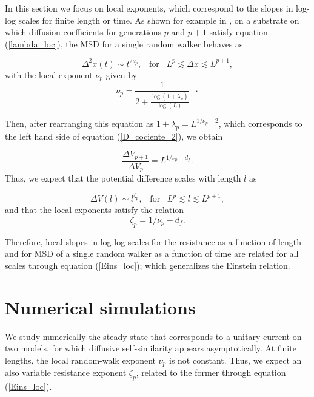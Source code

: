 \documentclass[12pt]{iopart}
\begin{document}
In this section we focus on  local exponents, which
correspond to the slopes in log-log scales for finite
length or time. As shown for example in \cite{Padilla2010}, on a substrate on which
diffusion coefficients for generations $p$ and $p+1$ satisfy
equation 
(\ref{lambda_loc}), the  MSD for a single random walker behaves as
 

\begin{equation}
    \Delta^2 x(t)\sim t^{2\nu_p},\;\;\;\mbox{for}\;\;\; L^p \lesssim \Delta x
    \lesssim L^{p+1}, 
    \label{msd-loc}
\end{equation}
with the local  exponent $\nu_p$ given by
\begin{equation}
    \nu_p =\frac{\displaystyle 1}{\displaystyle 2+\frac{\displaystyle
    \log(1+\lambda_p)}{\displaystyle \log(L)}}\;\;\cdot
    \label{nu_loc}
\end{equation}

Then, after rearranging this equation as $1+\lambda_p=L^{1/\nu_p-2}$, which 
corresponds to the  left hand side of equation (\ref{D_cociente_2}), 
we obtain

\begin{equation}
  \frac{\Delta V_{p+1}}{\Delta V_{p}}=L^{1/\nu_p-d_f}.
  \label{DeltaV_loc}
\end{equation}
Thus, we expect that the potential difference  scales with 
length $l$ as

\begin{equation}
    \Delta V(l) \sim l^{\zeta_p},\;\;\;\mbox{for}\;\;\; L^p \lesssim l
    \lesssim L^{p+1}, 
    \label{DV-loc}
\end{equation}
and that the local exponents satisfy the relation
\begin{equation}
  \zeta_p=1/\nu_p-d_f.
  \label{Eins_loc}
\end{equation}

Therefore, local slopes in log-log scales for the resistance as
a function of length and for  MSD of a single random walker
as a function of time are related for all scales through equation
(\ref{Eins_loc}); which generalizes the Einstein relation.

\section{Numerical simulations}\label{sec:numeric}
We study numerically the steady-state that corresponds to a unitary current on
two models, for which diffusive self-similarity appears asymptotically. At
finite lengths, the local random-walk exponent $\nu_p$ is not constant. 
Thus, we expect an also variable resistance exponent
$\zeta_p$, related to the former through equation (\ref{Eins_loc}). 
\end{document}
